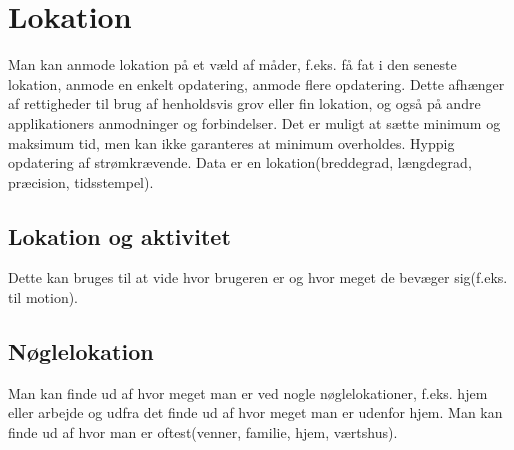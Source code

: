 \section{Lokation}
Man kan anmode lokation på et væld af måder, f.eks. få fat i den seneste lokation, anmode en enkelt opdatering, anmode flere opdatering. 
Dette afhænger af rettigheder til brug af henholdsvis grov eller fin lokation, og også på andre applikationers anmodninger og forbindelser. Det er muligt at sætte minimum og maksimum tid, men kan ikke garanteres at minimum overholdes. Hyppig opdatering af strømkrævende. 
Data er en lokation(breddegrad, længdegrad, præcision, tidsstempel).

\subsection{Lokation og aktivitet}
Dette kan bruges til at vide hvor brugeren er og hvor meget de bevæger sig(f.eks. til motion).

\subsection{Nøglelokation}
Man kan finde ud af hvor meget man er ved nogle nøglelokationer, f.eks. hjem eller arbejde og udfra det finde ud af hvor meget man er udenfor hjem. Man kan finde ud af hvor man er oftest(venner, familie, hjem, værtshus).


